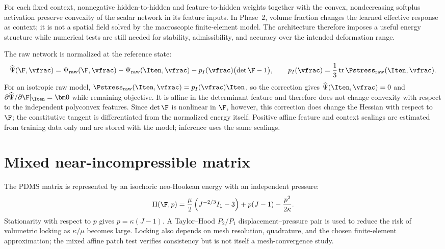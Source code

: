For each fixed context, nonnegative hidden-to-hidden and feature-to-hidden
weights together with the convex, nondecreasing softplus activation preserve
convexity of the scalar network in its feature inputs. In Phase~2, volume
fraction changes the learned effective response as context; it is not a
spatial field solved by the macroscopic finite-element model. The architecture
therefore imposes a useful energy structure while numerical tests are still
needed for stability, admissibility, and accuracy over the intended
deformation range.

The raw network is normalized at the reference state:
\begin{equation}
  \widehat\Psi(\F,\vfrac)
  =
  \Psi_{\mathrm{raw}}(\F,\vfrac)
  -\Psi_{\mathrm{raw}}(\Iten,\vfrac)
  -p_I(\vfrac)\bigl(\det\F-1\bigr),
  \qquad
  p_I(\vfrac)=\frac{1}{3}
  \operatorname{tr}\Pstress_{\mathrm{raw}}(\Iten,\vfrac).
  \label{eq:normalization}
\end{equation}
For an isotropic raw model,
\(\Pstress_{\mathrm{raw}}(\Iten,\vfrac)=p_I(\vfrac)\Iten\), so the correction
gives \(\widehat\Psi(\Iten,\vfrac)=0\) and
\(\partial\widehat\Psi/\partial\F|_{\Iten}=\bm 0\) while remaining objective.
It is affine in the determinant feature and therefore does not change
convexity with respect to the independent polyconvex features. Since
\(\det\F\) is nonlinear in \(\F\), however, this correction does change the
Hessian with respect to \(\F\); the constitutive tangent is differentiated
from the normalized energy itself. Positive affine feature and context
scalings are estimated from training data only and are stored with the model;
inference uses the same scalings.

\section{Mixed near-incompressible matrix}

The PDMS matrix is represented by an isochoric neo-Hookean energy with an
independent pressure:
\begin{equation}
  \Pi(\F,p)
  =
  \frac{\mu}{2}\left(J^{-2/3}I_1-3\right)
  +p(J-1)-\frac{p^2}{2\kappa}.
  \label{eq:mixed-energy}
\end{equation}
Stationarity with respect to \(p\) gives
\(p=\kappa(J-1)\). A Taylor--Hood \(P_2/P_1\)
displacement--pressure pair is used to reduce the risk of volumetric locking
as \(\kappa/\mu\) becomes large. Locking also depends on mesh resolution,
quadrature, and the chosen finite-element approximation; the mixed affine
patch test verifies consistency but is not itself a mesh-convergence study.

